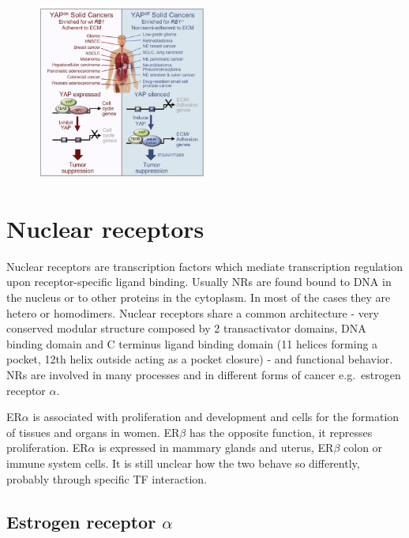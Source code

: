 \begin{figure}
\centering
\includegraphics[width=0.5\textwidth]{../_resources/Screen_Shot_2022-11-18_at_11-11-12.png}
\caption{}
\label{fig:canyt}
\end{figure}

\hypertarget{nuclear-receptors}{%
\section{Nuclear receptors}\label{nuclear-receptors}}

Nuclear receptors are transcription factors which mediate transcription regulation upon receptor-specific ligand binding. Usually NRs are found bound to DNA in the nucleus or to other proteins in the cytoplasm. In most of the cases they are hetero or homodimers. Nuclear receptors share a common architecture - very conserved modular structure composed by 2 transactivator domains, DNA binding domain and C terminus ligand binding domain (11 helices forming a pocket, 12th helix outside acting as a pocket closure) - and functional behavior. NRs are involved in many processes and in different forms of cancer e.g.~estrogen receptor $\alpha$.

ER$\alpha$ is associated with proliferation and development and cells for the formation of tissues and organs in women. ER$\beta$ has the opposite function, it represses proliferation. ER$\alpha$ is expressed in mammary glands and uterus, ER$\beta$ colon or immune system cells. It is still unclear how the two behave so differently, probably through specific TF interaction.

\hypertarget{estrogen-receptor-alpha}{%
\subsection{\texorpdfstring{Estrogen receptor \(\alpha\)}{Estrogen receptor \textbackslash alpha}}\label{estrogen-receptor-alpha}}

